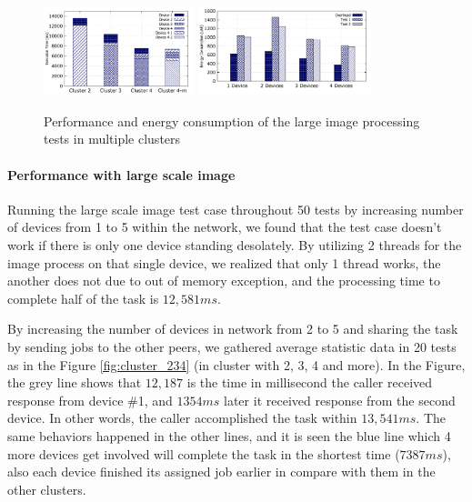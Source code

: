 \documentclass[conference]{IEEEtran}
\begin{document}
\begin{figure}
	\centering
		\includegraphics[width=0.39\textwidth]{data/img_perf.pdf}
		\includegraphics[width=0.45\textwidth]{data/img_energy.pdf}
	\caption{Performance and energy consumption of the large image processing tests in multiple clusters}
	\label{fig:cluster_performance}
\end{figure}

\paragraph{Performance with large scale image}
Running the large scale image test case throughout 50 tests by increasing number of devices from 1 to 5 within the network, we found that the test case doesn't work if there is only one device standing desolately. By utilizing 2 threads for the image process on that single device, we realized that only 1 thread works, the another does not due to out of memory exception, and the processing time to complete half of the task is $12,581ms$. 

By increasing the number of devices in network from 2 to 5 and sharing the task by sending jobs to the other peers, we gathered average statistic data in 20 tests as in the Figure \ref{fig:cluster_234} (in cluster with 2, 3, 4 and more). In the Figure, the grey line shows that $12,187$ is the time in millisecond the caller received response from device \#1, and $1354ms$ later it received response from the second device. In other words, the caller accomplished the task within $13,541ms$. The same behaviors happened in the other lines, and it is seen the blue line which 4 more devices get involved will complete the task in the shortest time ($7387ms$), also each device finished its assigned job earlier in compare with them in the other clusters. 
\end{document}

